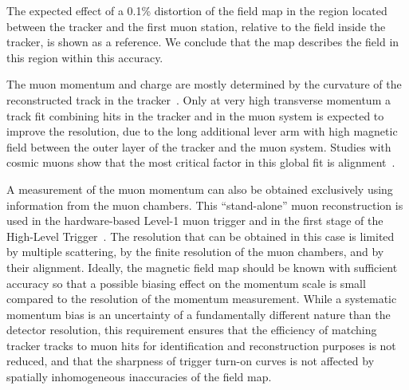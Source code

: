 The expected effect of a 0.1\% distortion of the field
map in the region located between the tracker and the first muon
station, relative to the field inside the tracker,
is shown as a reference. We conclude that the map
describes the field in this region within this accuracy.

The muon momentum and charge are mostly determined by the curvature of
the reconstructed track in the tracker~\cite{PTDR1}.
Only at very high transverse momentum a track fit combining hits in
the tracker and in the muon system is expected to improve the resolution,
due to the long additional lever arm with high magnetic field between
the outer layer of the tracker and the muon system.
Studies with
cosmic muons show that the most critical factor in this global fit is
alignment~\cite{CFTMuonReco, CFTMuTrackAlignment}.

A measurement of the muon momentum can also be obtained exclusively using
information from the muon chambers.
This ``stand-alone'' muon reconstruction is used in
the hardware-based \mbox{Level-1} muon trigger
and in the first stage of the High-Level Trigger~\cite{HLT}.
The resolution that can be obtained in this case is limited by
multiple scattering, by the finite resolution of the muon chambers, and
by their alignment.
Ideally, the magnetic field map should be known with sufficient
accuracy so that a possible biasing effect on the momentum scale is
small compared to the resolution of the momentum measurement.  While a
systematic momentum bias is an uncertainty of a fundamentally
different nature than the detector resolution, this requirement
ensures that the efficiency of matching tracker tracks to
muon hits for identification and reconstruction purposes is not
reduced, and that the sharpness of trigger turn-on curves is not
affected by spatially inhomogeneous inaccuracies of the field map.

